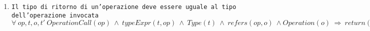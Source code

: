 
\begin{enumerate}
	\item \texttt{Il tipo di ritorno di un'operazione deve essere uguale al tipo dell'operazione invocata} \\
		  $\forall \ op,t,o,t' \ OperationCall(op) \ \land \ typeExpr(t, op) \ \land \ Type(t) \ \land \ refers(op, o) \ \land Operation(o) \ \Rightarrow \ return(t, o)$ \\
\end{enumerate}
